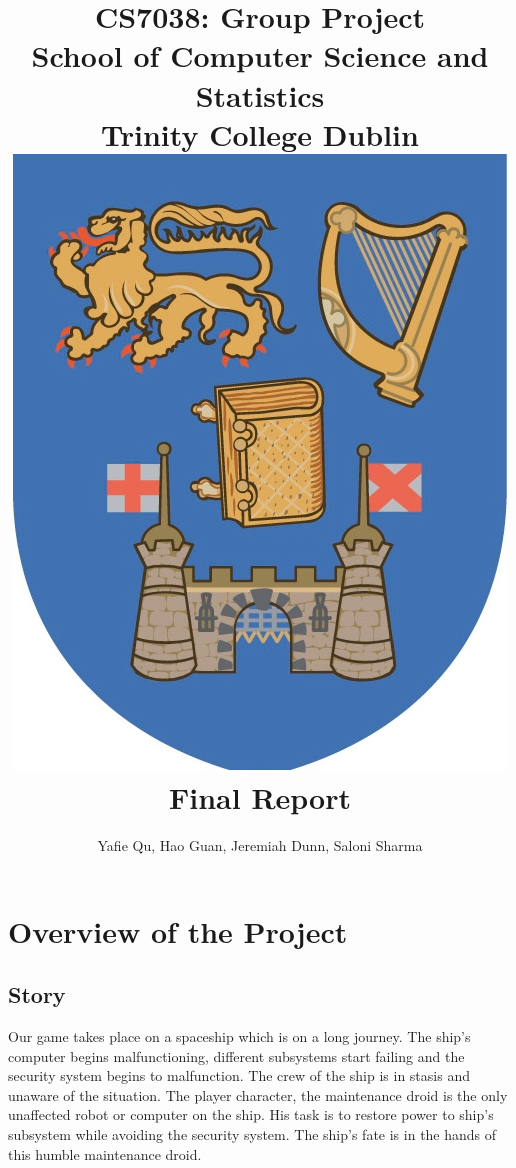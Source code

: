 \documentclass[11pt]{article}
\begin{document}
\title{ CS7038: Group Project\\School of Computer Science and Statistics\vspace{0.6cm}\\Trinity College Dublin\vspace{0.4cm}\\\includegraphics[scale=1.5]{TCD.jpg}\vspace{0.6cm}\\Final Report}
\author{Yafie Qu, Hao Guan, Jeremiah Dunn, Saloni Sharma}
\maketitle
\section{Overview of the Project}
\subsection{Story}
Our game takes place on a spaceship which is on a long journey. The ship's computer begins malfunctioning, different subsystems start failing and the security system begins to malfunction. The crew of the ship is in stasis and unaware of the situation. The player  character, the maintenance droid is the only unaffected robot or computer on the ship. His task is to restore power to ship's subsystem while avoiding the security system. The ship's fate is in the hands of this humble maintenance droid.
\end{document}

